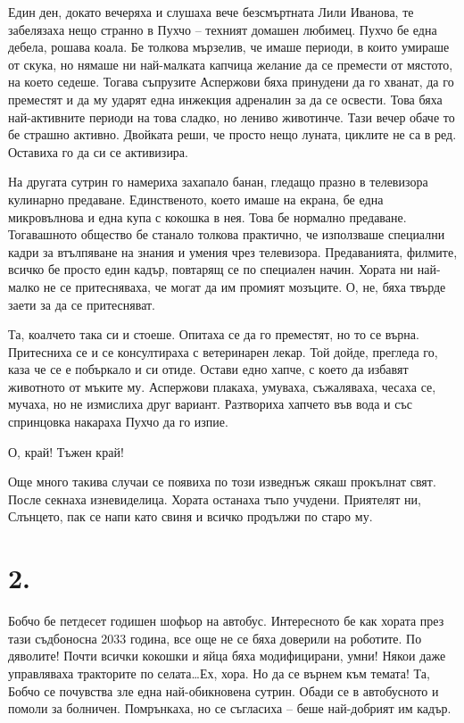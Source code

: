 \documentclass[ebook,openany,12pt]{memoir}
\begin{document}
Един ден, докато вечеряха и слушаха вече безсмъртната Лили Иванова, те забелязаха нещо странно в Пухчо – техният домашен любимец. Пухчо бе една дебела, рошава коала. Бе толкова мързелив, че имаше периоди, в които умираше от скука, но нямаше ни най-малката капчица желание да се премести от мястото, на което седеше. Тогава съпрузите Аспержови бяха принудени да го хванат, да го преместят и да му ударят една инжекция адреналин за да се освести. Това бяха най-активните периоди на това сладко, но лениво животинче. Тази вечер обаче то бе страшно активно. Двойката реши, че просто нещо луната, циклите не са в ред. Оставиха го да си се активизира.

На другата сутрин го намериха захапало банан, гледащо празно в телевизора кулинарно предаване.  Единственото, което имаше на екрана, бе една микровълнова и една купа с кокошка в нея. Това бе нормално предаване. Тогавашното общество бе станало толкова практично, че използваше специални кадри за втълпяване на знания и умения чрез телевизора. Предаванията, филмите, всичко бе просто един кадър, повтарящ се по специален начин. Хората ни най-малко не се притесняваха, че могат да им промият мозъците. О, не, бяха твърде заети за да се притесняват. 

Та, коалчето така си и стоеше. Опитаха се да го преместят, но то се върна. Притесниха се и се консултираха с ветеринарен лекар. Той дойде, прегледа го, каза че се е побъркало и си отиде. Остави едно хапче, с което да избавят животното от мъките му. Аспержови плакаха, умуваха, съжаляваха, чесаха се, мучаха, но не измислиха друг вариант. Разтвориха хапчето във вода и със спринцовка накараха Пухчо да го изпие.

О, край! Тъжен край!

Още много такива случаи се появиха по този изведнъж сякаш прокълнат свят. После секнаха изневиделица. Хората останаха тъпо учудени. Приятелят ни, Слънцето, пак се напи като свиня и всичко продължи по старо му. 

\section*{2.}

Бобчо бе петдесет годишен шофьор на автобус. Интересното бе как хората през тази съдбоносна 2033 година, все още не се бяха доверили на роботите. По дяволите! Почти всички кокошки и яйца бяха модифицирани, умни! Някои даже управляваха тракторите по селата\ldots Ех, хора. Но да се върнем към темата! Та, Бобчо се почувства зле една най-обикновена сутрин. Обади се в автобусното и помоли за болничен. Помрънкаха, но се съгласиха – беше най-добрият им кадър.
\end{document}
